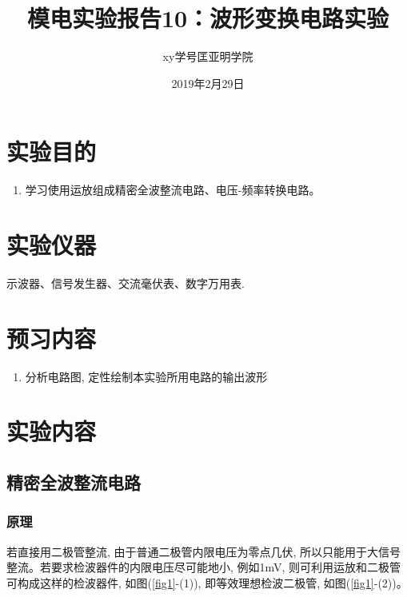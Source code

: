 \documentclass[a4paper]{article}
\title{模电实验报告10：波形变换电路实验}
\author{xy\quad 学号\quad 匡亚明学院}
\date{2019年2月29日}
\begin{document}
\maketitle


\section{实验目的}
\begin{enumerate}
\item 学习使用运放组成精密全波整流电路、电压-频率转换电路。
\end{enumerate}

\section{实验仪器}
示波器、信号发生器、交流毫伏表、数字万用表.

\section{预习内容}
\begin{enumerate}
\item 分析电路图, 定性绘制本实验所用电路的输出波形
\end{enumerate}

\section{实验内容}
\subsection{精密全波整流电路}
\subsubsection{原理}
若直接用二极管整流, 由于普通二极管内限电压为零点几伏, 所以只能用于大信号整流。若要求检波器件的内限电压尽可能地小, 例如1mV, 则可利用运放和二极管可构成这样的检波器件, 如图(\ref{fig1}-(1)), 即等效理想检波二极管, 如图(\ref{fig1}-(2))。
\end{document}
